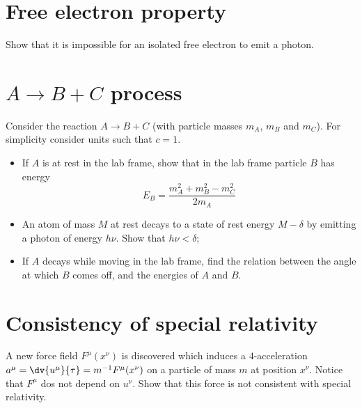 \documentclass[a4paper, 11pt, oneside]{impression}
\begin{document}
\chapter{Free electron property}\label{quest: seven}

\begin{exercise}{}
    Show that it is impossible for an isolated free electron to emit a photon.
\end{exercise}



\newpage

\chapter{\texorpdfstring{$A \to B + C$}{} process}\label{quest: eight}

\begin{exercise}{}
    Consider the reaction $A \to B + C$ (with particle masses $m_{A}$, $m_{B}$ and $m_{C}$). For simplicity consider units such that $c=1$.
    \begin{itemize}
        \item If $A$ is at rest in the lab frame, show that in the lab frame particle $B$ has energy 
        \begin{equation*}
            E_{B} = \dfrac{m_{A}^{2} + m_{B}^{2} - m_{C}^{2}}{2m_{A}}
        \end{equation*}
        \item An atom of mass $M$ at rest decays to a state of rest energy $M - \delta$ by emitting a photon of energy $h\nu$. Show that $h\nu < \delta$;
        \item If $A$ decays while moving in the lab frame, find the relation between the angle at which $B$ comes off, and the energies of $A$ and $B$.
    \end{itemize}
\end{exercise}



\newpage

\chapter{Consistency of special relativity}\label{quest: nine}

\begin{exercise}{}
    A new force field $F^{\mu}(x^{\nu})$ is discovered which induces a $4$-acceleration $a^{\mu} = \dv{u^{\mu}}{\tau} = m^{-1}F^{\mu}(x^{\nu})$ on a particle of mass $m$ at position $x^{\nu}$. Notice that $F^{\mu}$ dos not depend on $u^{\nu}$. Show that this force is not consistent with special relativity.
\end{exercise}
\end{document}
